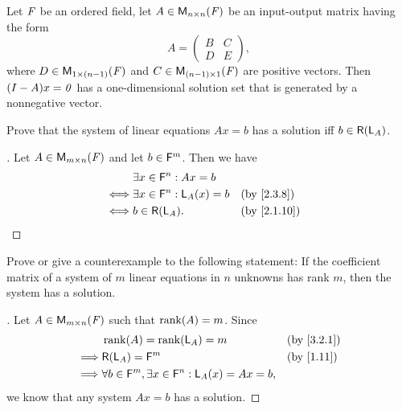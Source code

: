 \begin{thm}\label{3.12}
  Let \(\mathit{F}\) be an ordered field, let \(A \in \ms[n][n][\F]\) be an input-output matrix having the form
  \[
    A = \begin{pmatrix}
      B & C \\
      D & E
    \end{pmatrix},
  \]
  where \(D \in \ms[1][(n - 1)][\F]\) and \(C \in \ms[(n - 1)][1][\F]\) are positive vectors.
  Then \((I - A)x = \mathit{0}\) has a one-dimensional solution set that is generated by a nonnegative vector.
\end{thm}

\exercisesection

\setcounter{ex}{8}
\begin{ex}\label{ex:3.3.9}
  Prove that the system of linear equations \(Ax = b\) has a solution iff \(b \in \rg{\L_A}\).
\end{ex}

\begin{proof}[]
  Let \(A \in \ms\) and let \(b \in \mathsf{F}^m\).
  Then we have
  \begin{align*}
         & \exists x \in \vs{F}^n : Ax = b                       \\
    \iff & \exists x \in \vs{F}^n : \L_A(x) = b &  & \by{2.3.8}  \\
    \iff & b \in \rg{\L_A}.                     &  & \by{2.1.10}
  \end{align*}
\end{proof}

\begin{ex}\label{ex:3.3.10}
  Prove or give a counterexample to the following statement:
  If the coefficient matrix of a system of \(m\) linear equations in \(n\) unknowns has rank \(m\), then the system has a solution.
\end{ex}

\begin{proof}[]
  Let \(A \in \ms\) such that \(\rk{A} = m\).
  Since
  \begin{align*}
             & \rk{A} = \rk{\L_A} = m                                             &  & \by{3.2.1} \\
    \implies & \rg{\L_A} = \vs{F}^m                                               &  & \by{1.11}  \\
    \implies & \forall b \in \vs{F}^m, \exists x \in \vs{F}^n : \L_A(x) = Ax = b,
  \end{align*}
  we know that any system \(Ax = b\) has a solution.
\end{proof}
